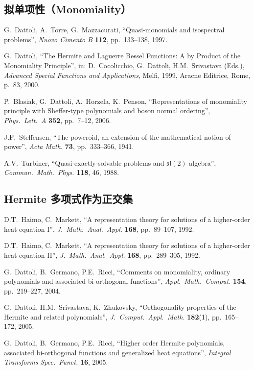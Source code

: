 \subsection*{拟单项性（Monomiality）}
\begin{enumerate}[label={[\arabic*]},start=10]
\item G.~Dattoli, A.~Torre, G.~Mazzacurati,
      ``Quasi-monomials and isospectral problems'',
      \emph{Nuovo Cimento B} \textbf{112}, pp.~133--138, 1997.
\item G.~Dattoli, ``The Hermite and Laguerre Bessel Functions:
      A by Product of the Monomiality Principle'', in:
      D.~Cocolicchio, G.~Dattoli, H.M.~Srivastava (Eds.),
      \emph{Advanced Special Functions and Applications},
      Melfi, 1999, Aracne Editrice, Rome, p.~83, 2000.
\item P.~Blasiak, G.~Dattoli, A.~Horzela, K.~Penson,
      ``Representations of monomiality principle with
      Sheffer-type polynomials and boson normal ordering'',
      \emph{Phys.\ Lett.\ A} \textbf{352}, pp.~7--12, 2006.
\item J.F.~Steffensen, ``The poweroid, an extension of the
      mathematical notion of power'',
      \emph{Acta Math.} \textbf{73}, pp.~333--366, 1941.
\item A.V.~Turbiner, ``Quasi-exactly-solvable problems and
      $\mathfrak{sl}(2)$ algebra'',
      \emph{Commun.\ Math.\ Phys.} \textbf{118}, 46, 1988.
\end{enumerate}

\subsection*{Hermite 多项式作为正交集}
\begin{enumerate}[label={[\arabic*]},start=15]
\item D.T.~Haimo, C.~Markett, ``A representation theory for
      solutions of a higher-order heat equation I'',
      \emph{J.\ Math.\ Anal.\ Appl.} \textbf{168},
      pp.~89--107, 1992.
\item D.T.~Haimo, C.~Markett, ``A representation theory for
      solutions of a higher-order heat equation II'',
      \emph{J.\ Math.\ Anal.\ Appl.} \textbf{168},
      pp.~289--305, 1992.
\item G.~Dattoli, B.~Germano, P.E.~Ricci,
      ``Comments on monomiality, ordinary polynomials and
      associated bi-orthogonal functions'',
      \emph{Appl.\ Math.\ Comput.} \textbf{154},
      pp.~219--227, 2004.
\item G.~Dattoli, H.M.~Srivastava, K.~Zhukovsky,
      ``Orthogonality properties of the Hermite and related
      polynomials'',
      \emph{J.\ Comput.\ Appl.\ Math.} \textbf{182}(1),
      pp.~165--172, 2005.
\item G.~Dattoli, B.~Germano, P.E.~Ricci,
      ``Higher order Hermite polynomials, associated
      bi-orthogonal functions and generalized heat
      equations'',
      \emph{Integral Transforms Spec.\ Funct.} \textbf{16},
      2005.
\end{enumerate}

